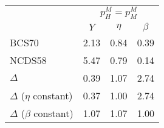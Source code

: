 
\begin{tabular}{lrrr}
\toprule
\multicolumn{1}{c}{} & \multicolumn{3}{c}{$p_{H}^{M}=p_{M}^{M}$} \\
\cmidrule(l{3pt}r{3pt}){2-4}
  & \multicolumn{1}{c}{$Y$} & \multicolumn{1}{c}{$\eta$} & \multicolumn{1}{c}{$\beta$}\\
\midrule
BCS70 & 2.13 & 0.84 & 0.39\\
NCDS58 & 5.47 & 0.79 & 0.14\\
\midrule
$\Delta$ & 0.39 & 1.07 & 2.74\\
\midrule
$\Delta$ ($\eta$ constant) & 0.37 & 1.00 & 2.74\\
$\Delta$ ($\beta$ constant) & 1.07 & 1.07 & 1.00\\
\bottomrule
\end{tabular}
